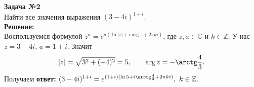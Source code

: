 \textbf{\large Задача №2}\\
\hspace*{0.5cm} Найти все значения выражения $(3-4i)^{1+i}$.\\[0.5cm]
\textbf{Решение:}\\
\hspace*{0.5cm} Воспользуемся формулой $z^a = e^{a(\ln|z| + i \arg z + 2\pi ki)}$, где $z, a \in \mathbb C$ и $k \in \mathbb Z$.
У нас $z = 3-4i$, $a = 1+i$.
Значит
\[|z| = \sqrt{3^2 + (-4)^2} = 5, \qquad \arg z = -\arctg\frac43.\]
Получаем \textbf{ответ:} $\displaystyle (3-4i)^{1+i} = e^{(1+i)(\ln5 + i \arctg\frac43 + 2\pi ki)},\ k \in \mathbb Z$.
\vspace{0.5cm}